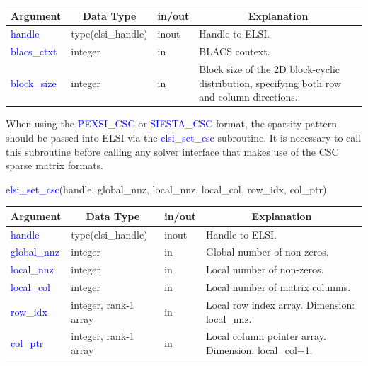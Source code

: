 \documentclass{report}
\begin{document}
\begin{tabular}[]{|p{30mm}|p{30mm}|p{15mm}|p{90mm}|}
\hline
\multicolumn{1}{|c|}{\textbf{Argument}} & \multicolumn{1}{c|}{\textbf{Data Type}} & \multicolumn{1}{c|}{\textbf{in/out}} & \multicolumn{1}{c|}{\textbf{Explanation}}\\
\hline
\textcolor{blue}{handle}      & type(elsi\_handle) & inout & Handle to ELSI.\\
\hline
\textcolor{blue}{blacs\_ctxt} & integer            & in    & BLACS context.\\
\hline
\textcolor{blue}{block\_size} & integer            & in    & Block size of the 2D block-cyclic distribution, specifying both row and column directions.\\
\hline
\end{tabular}

When using the \textcolor{blue}{PEXSI\_CSC} or \textcolor{blue}{SIESTA\_CSC} format, the sparsity pattern should be passed into ELSI via the \textcolor{blue}{elsi\_set\_csc} subroutine.  It is necessary to call this subroutine before calling any solver interface that makes use of the CSC sparse matrix formats.
\begin{labeling}{\hspace{6cm}}
\item [\hspace{0.3cm} \textcolor{blue}{elsi\_set\_csc}(handle, global\_nnz, local\_nnz, local\_col, row\_idx, col\_ptr)]
\end{labeling}

\begin{tabular}[]{|p{30mm}|p{35mm}|p{15mm}|p{85mm}|}
\hline
\multicolumn{1}{|c|}{\textbf{Argument}} & \multicolumn{1}{c|}{\textbf{Data Type}} & \multicolumn{1}{c|}{\textbf{in/out}} & \multicolumn{1}{c|}{\textbf{Explanation}}\\
\hline
\textcolor{blue}{handle}      & type(elsi\_handle)    & inout & Handle to ELSI.\\
\hline
\textcolor{blue}{global\_nnz} & integer               & in    & Global number of non-zeros.\\
\hline
\textcolor{blue}{local\_nnz}  & integer               & in    & Local number of non-zeros.\\
\hline
\textcolor{blue}{local\_col}  & integer               & in    & Local number of matrix columns.\\
\hline
\textcolor{blue}{row\_idx}    & integer, rank-1 array & in    & Local row index array.  Dimension: local\_nnz.\\
\hline
\textcolor{blue}{col\_ptr}    & integer, rank-1 array & in    & Local column pointer array.  Dimension: local\_col+1.\\
\hline
\end{tabular}
\end{document}
